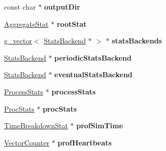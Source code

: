 \begin{DoxyCompactItemize}
\item 
\hypertarget{structGlobSimInfo_accbda8127834c4a06070d08d45d4c833}{const char $\ast$ {\bfseries output\-Dir}}\label{structGlobSimInfo_accbda8127834c4a06070d08d45d4c833}

\item 
\hypertarget{structGlobSimInfo_a63d4786fb729ceda5175068123f120d8}{\hyperlink{classAggregateStat}{Aggregate\-Stat} $\ast$ {\bfseries root\-Stat}}\label{structGlobSimInfo_a63d4786fb729ceda5175068123f120d8}

\item 
\hypertarget{structGlobSimInfo_abcfbddad200e6f02d1b39dc89ac1f757}{\hyperlink{classg__vector}{g\-\_\-vector}$<$ \hyperlink{classStatsBackend}{Stats\-Backend} $\ast$ $>$ $\ast$ {\bfseries stats\-Backends}}\label{structGlobSimInfo_abcfbddad200e6f02d1b39dc89ac1f757}

\item 
\hypertarget{structGlobSimInfo_a0429cb2e0dda461b814739c63f1d3f6e}{\hyperlink{classStatsBackend}{Stats\-Backend} $\ast$ {\bfseries periodic\-Stats\-Backend}}\label{structGlobSimInfo_a0429cb2e0dda461b814739c63f1d3f6e}

\item 
\hypertarget{structGlobSimInfo_adca0a4e49f4a5667defe6f47dca38a46}{\hyperlink{classStatsBackend}{Stats\-Backend} $\ast$ {\bfseries eventual\-Stats\-Backend}}\label{structGlobSimInfo_adca0a4e49f4a5667defe6f47dca38a46}

\item 
\hypertarget{structGlobSimInfo_a683c0349d5ac159813968f7a13e33887}{\hyperlink{classProcessStats}{Process\-Stats} $\ast$ {\bfseries process\-Stats}}\label{structGlobSimInfo_a683c0349d5ac159813968f7a13e33887}

\item 
\hypertarget{structGlobSimInfo_a4a7e8f1b8ff9b62adfb9abde7f624cab}{\hyperlink{classProcStats}{Proc\-Stats} $\ast$ {\bfseries proc\-Stats}}\label{structGlobSimInfo_a4a7e8f1b8ff9b62adfb9abde7f624cab}

\item 
\hypertarget{structGlobSimInfo_a6dac03c2bd50abf8007b612f3047a6f8}{\hyperlink{classTimeBreakdownStat}{Time\-Breakdown\-Stat} $\ast$ {\bfseries prof\-Sim\-Time}}\label{structGlobSimInfo_a6dac03c2bd50abf8007b612f3047a6f8}

\item 
\hypertarget{structGlobSimInfo_a977e7ac65708675868c139d694a22fd4}{\hyperlink{classVectorCounter}{Vector\-Counter} $\ast$ {\bfseries prof\-Heartbeats}}\label{structGlobSimInfo_a977e7ac65708675868c139d694a22fd4}


\end{DoxyCompactItemize}
